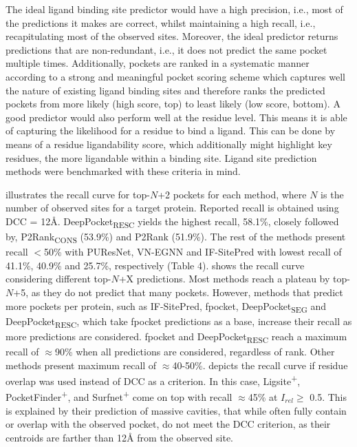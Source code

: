 The ideal ligand binding site predictor would have a high precision, i.e., most of the predictions it makes are correct, whilst maintaining a high recall, i.e., recapitulating most of the observed sites. Moreover, the ideal predictor returns predictions that are non-redundant, i.e., it does not predict the same pocket multiple times. Additionally, pockets are ranked in a systematic manner according to a strong and meaningful pocket scoring scheme which captures well the nature of existing ligand binding sites and therefore ranks the predicted pockets from more likely (high score, top) to least likely (low score, bottom). A good predictor would also perform well at the residue level. This means it is able of capturing the likelihood for a residue to bind a ligand. This can be done by means of a residue ligandability score, which additionally might highlight key residues, the more ligandable within a binding site. Ligand site prediction methods were benchmarked with these criteria in mind.

 illustrates the recall curve for top-$N$+2 pockets for each method, where $N$ is the number of observed sites for a target protein. Reported recall is obtained using DCC = 12\AA{}. DeepPocket\textsubscript{RESC} yields the highest recall, 58.1\%, closely followed by, P2Rank\textsubscript{CONS} (53.9\%) and P2Rank (51.9\%). The rest of the methods present recall $<$50\% with PUResNet, VN-EGNN and IF-SitePred with lowest recall of 41.1\%, 40.9\% and 25.7\%, respectively (Table 4).  shows the recall curve considering different top-$N$+X predictions. Most methods reach a plateau by top-$N$+5, as they do not predict that many pockets. However, methods that predict more pockets per protein, such as IF-SitePred, fpocket, DeepPocket\textsubscript{SEG} and DeepPocket\textsubscript{RESC}, which take fpocket predictions as a base, increase their recall as more predictions are considered. fpocket and DeepPocket\textsubscript{RESC} reach a maximum recall of $\approx$90\% when all predictions are considered, regardless of rank. Other methods present maximum recall of $\approx$40-50\%.  depicts the recall curve if residue overlap was used instead of DCC as a criterion. In this case, Ligsite\textsuperscript{+}, PocketFinder\textsuperscript{+}, and Surfnet\textsuperscript{+} come on top with recall $\approx$45\% at $I_{rel} \geq$ 0.5. This is explained by their prediction of massive cavities, that while often fully contain or overlap with the observed pocket, do not meet the DCC criterion, as their centroids are farther than 12\AA{} from the observed site.

